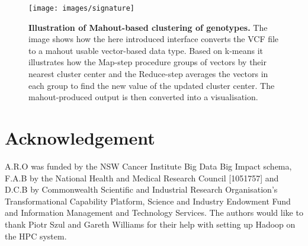 \documentclass{bioinfo}
\begin{document}
\begin{figure}[!tpb]%
\centerline{\texttt{[image: images/signature]}}
        \label{fig:sign}
        \caption{{\bf Illustration of Mahout-based clustering of genotypes.}
      The image shows how the here introduced interface converts the VCF file to a mahout usable vector-based data type. Based on k-means it illustrates how the Map-step procedure groups of vectors by their nearest cluster center and the Reduce-step averages the vectors in each group to find the new value of the updated cluster center. The mahout-produced output is then converted into a visualisation.}

\end{figure}





\section*{Acknowledgement}
A.R.O was funded by the NSW Cancer Institute Big Data Big Impact schema, F.A.B by the National Health and Medical Research Council [1051757] and D.C.B by Commonwealth Scientific and Industrial Research Organisation's Transformational Capability Platform, Science and Industry Endowment Fund and Information Management and Technology Services.
The authors would like to thank Piotr Szul and Gareth Williams for their help with setting up Hadoop on the HPC system.  


%
%
%
%
  
\end{document}
